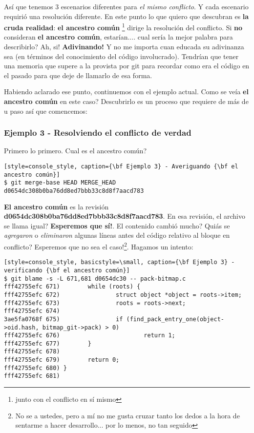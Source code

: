 Así que tenemos 3 escenarios diferentes para {\it el mismo conflicto}. Y cada escenario requirió una resolución diferente.
En este punto lo que quiero que descubran es {\bf la cruda realidad}: {\bf el ancestro común} \footnote{junto con el conflicto
en sí mismo} dirige la resolución del conflicto. Si {\bf no} consideran {\bf el ancestro común}, estarían.... cual sería la mejor
palabra para describirlo? Ah, si! {\bf Adivinando!} Y no me importa cuan educada su adivinanza sea (en términos del conocimiento
del código involucrado). Tendrían que tener una memoria que supere a la provista por git para recordar como era el código en el
pasado para que deje de llamarlo de esa forma.

Habiendo aclarado ese punto, continuemos con el ejemplo actual. Como se veía {\bf el ancestro común} en este caso? Descubrirlo es un
proceso que requiere de más de u paso así que comencemos:

\subsubsection{Ejemplo 3 - Resolviendo el conflicto de verdad}
Primero lo primero. Cual es el ancestro común?

\begin{lstlisting}[style=console_style, caption={\bf Ejemplo 3} - Averiguando {\bf el ancestro común}]
$ git merge-base HEAD MERGE_HEAD
d0654dc308b0ba76dd8ed7bbb33c8d8f7aacd783
\end{lstlisting}

{\bf El ancestro común} es la revisión {\bf d0654dc308b0ba76dd8ed7bbb33c8d8f7aacd783}. En esa revisión, el archivo
se llama igual? {\bf Esperemos que sí!}. El contenido cambió mucho? Quiás se {\it agregaron} o {\it eliminaron} algunas líneas
antes del código relativo al bloque en conflicto? Esperemos que no sea el caso!\footnote{No se a ustedes, pero a mí no me gusta
cruzar tanto los dedos a la hora de sentarme a hacer desarrollo... por lo menos, no tan seguido}. Hagamos un intento:

\begin{lstlisting}[style=console_style, basicstyle=\small, caption={\bf Ejemplo 3} - verificando {\bf el ancestro común}]
$ git blame -s -L 671,681 d0654dc30 -- pack-bitmap.c
fff42755efc 671)        while (roots) {
fff42755efc 672)                struct object *object = roots->item;
fff42755efc 673)                roots = roots->next;
fff42755efc 674) 
3ae5fa0768f 675)                if (find_pack_entry_one(object->oid.hash, bitmap_git->pack) > 0)
fff42755efc 676)                        return 1;
fff42755efc 677)        }
fff42755efc 678) 
fff42755efc 679)        return 0;
fff42755efc 680) }
fff42755efc 681)
\end{lstlisting}


